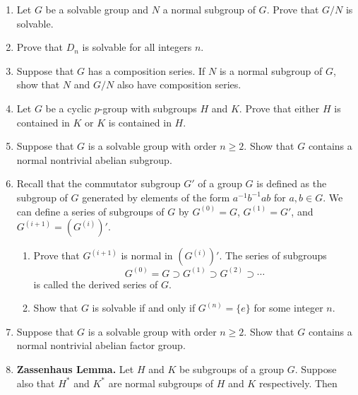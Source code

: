 {\begin{enumerate}
\bf\item\rm
Let $G$ be a solvable group and $N$ a normal subgroup of $G$.  Prove
that $G/N$ is solvable.
 
\bf\item\rm
Prove that $D_n$ is solvable for all integers $n$.
 
 
\bf\item\rm
Suppose that $G$ has a composition series.  If $N$ is a normal
subgroup of $G$, show that $N$ and $G/N$ also have composition series.
 
\bf\item\rm
Let $G$ be a cyclic $p$-group with subgroups $H$ and $K$.  Prove that
either $H$ is contained in $K$ or $K$ is contained in $H$.
 
\bf\item\rm
Suppose that $G$ is a solvable group with order $n \geq 2$.
Show that $G$ contains a normal nontrivial abelian subgroup.
 
\bf\item\rm
Recall that the {\bfi commutator
subgroup\/} $G'$ of a group $G$ is
defined as the subgroup of $G$ generated by elements of the form
$a^{-1} b ^{-1} ab$ for $a, b \in G$.  We can define a series of
subgroups of $G$ by $G^{(0)} = G$, $G^{(1)} = G'$, and $G^{(i+1)} =
(G^{(i)})'$.
\begin{enumerate}
 
\bf\item\rm
Prove that $G^{(i+1)}$ is normal in $(G^{(i)})'$.  The series of
subgroups
\[
G^{(0)} = G \supset G^{(1)} \supset G^{(2)} \supset \cdots
\]
is called the {\bfi derived series\/} of $G$.
 
\bf\item\rm
Show that $G$ is solvable if and only if $G^{(n)} = \{ e \}$ for some
integer $n$.
 
\end{enumerate}
 
 
\bf\item\rm
Suppose that $G$ is a solvable group with order $n \geq 2$.
Show that $G$ contains a normal nontrivial abelian factor group.
 
 
 
 
\bf\item\rm
{\bf Zassenhaus Lemma.}
Let $H$ and $K$ be subgroups of a group $G$. Suppose also that $H^*$
and $K^*$ are normal subgroups of $H$ and $K$ respectively.  Then
\begin{enumerate}
 

\end{enumerate}
\end{enumerate}}
